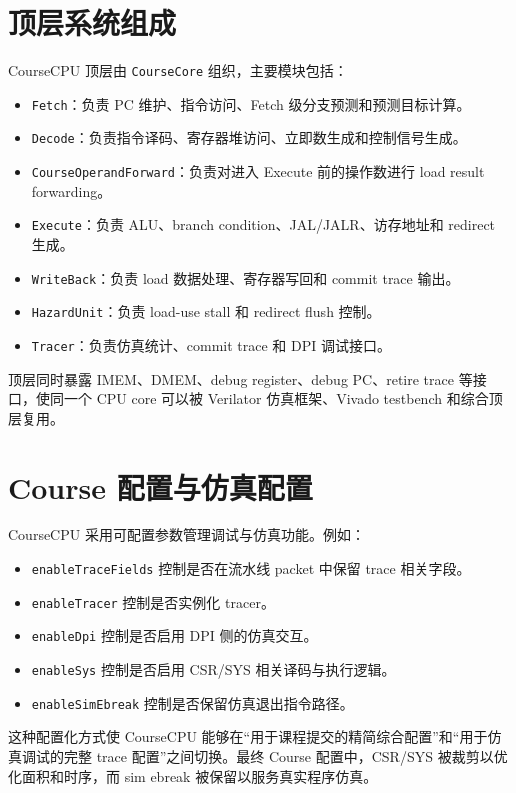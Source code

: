 \documentclass[UTF8,a4paper,12pt]{ctexrep}
\begin{document}
\section{顶层系统组成}

CourseCPU 顶层由 \texttt{CourseCore} 组织，主要模块包括：

\begin{itemize}
  \item \texttt{Fetch}：负责 PC 维护、指令访问、Fetch 级分支预测和预测目标计算。
  \item \texttt{Decode}：负责指令译码、寄存器堆访问、立即数生成和控制信号生成。
  \item \texttt{CourseOperandForward}：负责对进入 Execute 前的操作数进行 load result forwarding。
  \item \texttt{Execute}：负责 ALU、branch condition、JAL/JALR、访存地址和 redirect 生成。
  \item \texttt{WriteBack}：负责 load 数据处理、寄存器写回和 commit trace 输出。
  \item \texttt{HazardUnit}：负责 load-use stall 和 redirect flush 控制。
  \item \texttt{Tracer}：负责仿真统计、commit trace 和 DPI 调试接口。
\end{itemize}

顶层同时暴露 IMEM、DMEM、debug register、debug PC、retire trace 等接口，使同一个 CPU core 可以被 Verilator 仿真框架、Vivado testbench 和综合顶层复用。

\section{Course 配置与仿真配置}

CourseCPU 采用可配置参数管理调试与仿真功能。例如：

\begin{itemize}
  \item \texttt{enableTraceFields} 控制是否在流水线 packet 中保留 trace 相关字段。
  \item \texttt{enableTracer} 控制是否实例化 tracer。
  \item \texttt{enableDpi} 控制是否启用 DPI 侧的仿真交互。
  \item \texttt{enableSys} 控制是否启用 CSR/SYS 相关译码与执行逻辑。
  \item \texttt{enableSimEbreak} 控制是否保留仿真退出指令路径。
\end{itemize}

这种配置化方式使 CourseCPU 能够在“用于课程提交的精简综合配置”和“用于仿真调试的完整 trace 配置”之间切换。最终 Course 配置中，CSR/SYS 被裁剪以优化面积和时序，而 sim ebreak 被保留以服务真实程序仿真。
\end{document}
